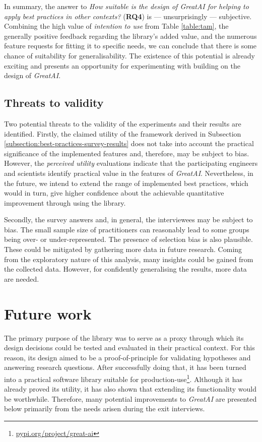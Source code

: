 In summary, the answer to \textit{How suitable is the design of GreatAI for helping to apply best practices in other contexts?} (\textbf{RQ4}) is --- unsurprisingly --- subjective. Combining the high value of \textit{intention to use} from Table \ref{table:tam}, the generally positive feedback regarding the library's added value, and the numerous feature requests for fitting it to specific needs, we can conclude that there is some chance of suitability for generalisability. The existence of this potential is already exciting and presents an opportunity for experimenting with building on the design of \textit{GreatAI}.

\subsection{Threats to validity}

Two potential threats to the validity of the experiments and their results are identified. Firstly, the claimed utility of the framework derived in Subsection \ref{subsection:best-practices-survey-results} does not take into account the practical significance of the implemented features and, therefore, may be subject to bias. However, the \textit{perceived utility} evaluations indicate that the participating engineers and scientists identify practical value in the features of \textit{GreatAI}. Nevertheless, in the future, we intend to extend the range of implemented best practices, which would in turn, give higher confidence about the achievable quantitative improvement through using the library.

Secondly, the survey answers and, in general, the interviewees may be subject to bias. The small sample size of practitioners can reasonably lead to some groups being over- or under-represented. The presence of selection bias is also plausible. These could be mitigated by gathering more data in future research. Coming from the exploratory nature of this analysis, many insights could be gained from the collected data. However, for confidently generalising the results, more data are needed.

\section{Future work} 

The primary purpose of the library was to serve as a proxy through which its design decisions could be tested and evaluated in their practical context. For this reason, its design aimed to be a proof-of-principle for validating hypotheses and answering research questions. After successfully doing that, it has been turned into a practical software library suitable for production-use\footnote{\href{https://pypi.org/project/great-ai/}{pypi.org/project/great-ai}}. Although it has already proved its utility, it has also shown that extending its functionality would be worthwhile. Therefore, many potential improvements to \textit{GreatAI} are presented below primarily from the needs arisen during the exit interviews.
 
